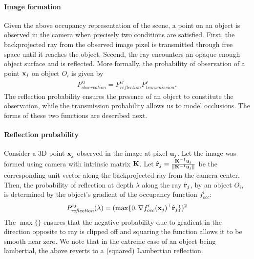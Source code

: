 \paragraph{Image formation}
Given the above occupancy representation of the scene, a point on an object is observed in the camera when precisely two conditions are satisfied. First, the backprojected ray from the observed image pixel is transmitted through free space until it reaches the object. Second, the ray encounters an opaque enough object surface and is reflected. More formally, the probability of observation of a point $\mathbf{x}_j$ on object $O_i$ is given by
\begin{align}
P^{ij}_{\textit{observation}} = P^{ij}_{\textit{reflection}}P^{j}_{\textit{transmission}}.
\label{eq:imgform}
\end{align}
The reflection probability ensures the presence of an object to constitute the observation, while the transmission probability allows us to model occlusions. The forms of these two functions are described next.


\paragraph{Reflection probability}
Consider a 3D point $\mathbf{x}_j$ observed in the image at pixel $\mathbf{u}_j$. Let the image was formed using camera with intrinsic matrix $\mathbf{K}$. Let $\hat{\mathbf{r}}_j = \frac{\mathbf{K}^{-1}\mathbf{u}_j}{\lVert \mathbf{K}^{-1}\mathbf{u}_j \rVert}$ be the corresponding unit vector along the backprojected ray from the camera center. Then, the probability of reflection at depth $\lambda$ along the ray $\hat{\mathbf{r}}_j$, by an object $O_i$, is determined by the object's gradient of the occupancy function $f_{occ}^i$:
\begin{align}
  P^{ij}_{\textit{reflection}} (\lambda) = (\max \{0, \nabla {f^i_{occ}}(\mathbf{x}_j)^\top \hat{\mathbf{r}}_j \})^2
\label{eq:evalPrefl}
\end{align}
The $\max \{ \}$ ensures that the negative probability due to gradient in the direction opposite to ray is clipped off and squaring the function allows it to be smooth near zero. We note that in the extreme case of an object being lambertial, the above reverts to a (squared) Lambertian reflection.


